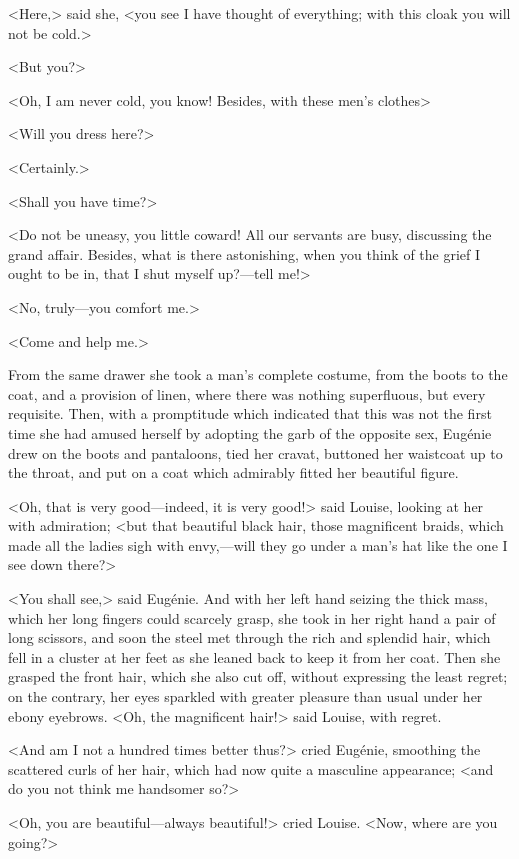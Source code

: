  <Here,> said she, <you see I have thought of everything; with this cloak you will not be cold.> 

 <But you?> 

 <Oh, I am never cold, you know! Besides, with these men's clothes\longdash> 

 <Will you dress here?> 

 <Certainly.> 

 <Shall you have time?> 

 <Do not be uneasy, you little coward! All our servants are busy, discussing the grand affair. Besides, what is there astonishing, when you think of the grief I ought to be in, that I shut myself up?—tell me!> 

 <No, truly—you comfort me.> 

 <Come and help me.> 

 From the same drawer she took a man's complete costume, from the boots to the coat, and a provision of linen, where there was nothing superfluous, but every requisite. Then, with a promptitude which indicated that this was not the first time she had amused herself by adopting the garb of the opposite sex, Eugénie drew on the boots and pantaloons, tied her cravat, buttoned her waistcoat up to the throat, and put on a coat which admirably fitted her beautiful figure. 

 <Oh, that is very good—indeed, it is very good!> said Louise, looking at her with admiration; <but that beautiful black hair, those magnificent braids, which made all the ladies sigh with envy,—will they go under a man's hat like the one I see down there?> 

 <You shall see,> said Eugénie. And with her left hand seizing the thick mass, which her long fingers could scarcely grasp, she took in her right hand a pair of long scissors, and soon the steel met through the rich and splendid hair, which fell in a cluster at her feet as she leaned back to keep it from her coat. Then she grasped the front hair, which she also cut off, without expressing the least regret; on the contrary, her eyes sparkled with greater pleasure than usual under her ebony eyebrows.  <Oh, the magnificent hair!> said Louise, with regret. 

 <And am I not a hundred times better thus?> cried Eugénie, smoothing the scattered curls of her hair, which had now quite a masculine appearance; <and do you not think me handsomer so?> 

 <Oh, you are beautiful—always beautiful!> cried Louise. <Now, where are you going?> 

